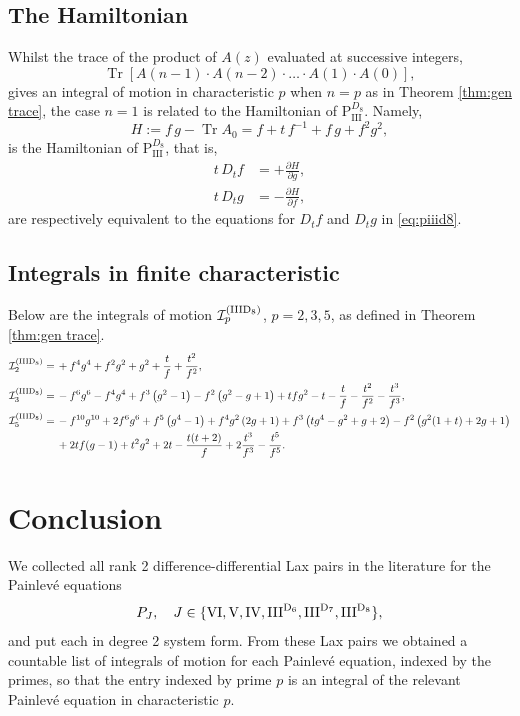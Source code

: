 \documentclass[a4paper,reqno]{amsart}
\numberwithin{equation}{section}
\numberwithin{figure}{section}
\theoremstyle{remark}
\newcommand\Pthree{\textrm{P}_{\textrm{III}}}
\begin{document}
\subsection{The Hamiltonian}Whilst the trace of the product of $A(z)$ evaluated at successive integers,
$$\operatorname{Tr}[A(n-1)\cdot A(n-2)\cdot\ldots\cdot A(1)\cdot A(0)],$$
gives an integral of motion in characteristic $p$ when $n=p$ as in Theorem \ref{thm:gen trace}, the case $n=1$ is related to the Hamiltonian of $\Pthree^{D_8}$. Namely,
\begin{equation*}
    H:=f\,g-\operatorname{Tr}A_0=f+t\,f^{-1}+f\,g+f^2g^2,
\end{equation*}
is the Hamiltonian of $\Pthree^{D_8}$, that is,
\begin{align*}
    t\,D_tf&=+\frac{\partial H}{\partial g},\\
    t\,D_tg&=-\frac{\partial H}{\partial f},
\end{align*}
are respectively equivalent to the equations for $D_tf$ and $D_tg$ in \eqref{eq:piiid8}.














\subsection{Integrals in finite characteristic}
Below are the integrals of motion $\mathcal{I}_p^{(\rm{IIID}_8)}$, $p=2,3,5$, as defined in Theorem \ref{thm:gen trace}.
\begin{align*}
\mathcal{I}_2^{(\rm{IIID}_8)} =&\,+ f^4 g^4+f^2 g^2+g^2+\frac{t}{f}+ \frac{t^2}{f^2},\\
\mathcal{I}_3^{(\rm{IIID}_8)} =&\, -f^6 g^6-f^4 g^4+f^3 \left(g^2-1\right)-f^2 \left(g^2-g+1\right)+t f g^2-t-\frac{t}{f}-\frac{ t^2}{f^2}-\frac{ t^3}{f^3},\\
 \mathcal{I}_5^{(\rm{IIID}_8)} =&\, -f^{10} g^{10}+2 f^6 g^6+f^5 \left(g^4-1\right)+f^4g^2 \left(2g+1\right)+f^3 \left(t g^4-g^2+ g+2\right)-f^2 \left( g^2(1+t)+2 g+1\right)\\
 &\,+2tf (g-1)+t^2 g^2+2 t-\frac{t(t+2)}{f}+2\frac{ t^3}{f^3}-\frac{t^5}{f^5}.
\end{align*}




\section{Conclusion}\label{sec:conclusion}
We collected all rank 2 difference-differential Lax pairs in the literature for the  Painlev\'e equations 
\begin{equation*}
    P_J,\quad J\in\{\rm{VI}, \rm{V}, \rm{IV}, \rm{III}^{D_6},\rm{III}^{D_7},\rm{III}^{D_8}\},
\end{equation*}
and put each in degree 2 system form. From these Lax pairs we obtained a countable list of integrals of motion for each Painlev\'e equation,
indexed by the primes, so that the entry indexed by prime $p$ is an integral of the relevant Painlev\'e equation in characteristic $p$.
\end{document}
